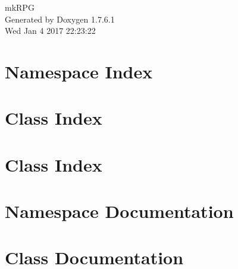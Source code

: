 \documentclass[a4paper]{book}
\begin{document}
\hypersetup{pageanchor=false,citecolor=blue}
\begin{titlepage}
\vspace*{7cm}
\begin{center}
{\Large mk\-R\-P\-G }\\
\vspace*{1cm}
{\large \-Generated by Doxygen 1.7.6.1}\\
\vspace*{0.5cm}
{\small Wed Jan 4 2017 22:23:22}\\
\end{center}
\end{titlepage}
\clearemptydoublepage
{}
\tableofcontents
\clearemptydoublepage
{}
\hypersetup{pageanchor=true,citecolor=blue}
\chapter{\-Namespace \-Index}

\chapter{\-Class \-Index}

\chapter{\-Class \-Index}

\chapter{\-Namespace \-Documentation}















\chapter{\-Class \-Documentation}



























\printindex
\end{document}
